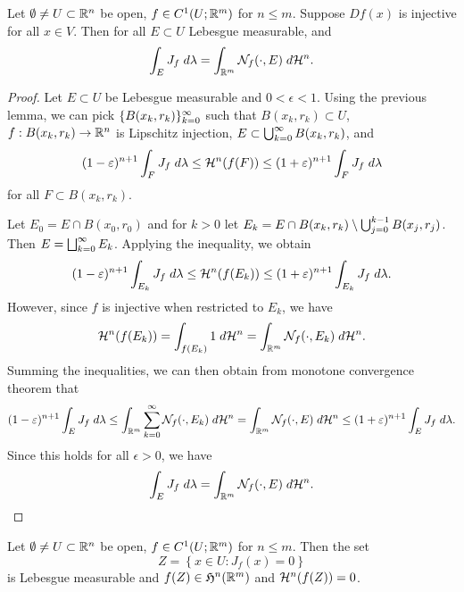 \documentclass[a4paper]{article}
\begin{document}
\begin{lemma}
Let $\emptyset \neq U \subset \mathbb{R}^n$ be open, $f \in C^1
(U ; \mathbb{R}^m)$ for $n \leq m$. Suppose $Df(x)$ is injective
for all $x \in V$. Then for all $E \subset U$ Lebesgue
measurable, and
\[
\int_E J_f \; d \lambda = \int_{\mathbb{R}^m} \mathcal{N}_f (\cdot, E) \; d \mathcal{H}^n.
\]
\end{lemma}

\begin{proof}
Let $E \subset U$ be Lebesgue measurable and $0 < \epsilon < 1$.
Using the previous lemma, we can pick $\{ B(x_k, r_k) \}_{k=0}^\infty$
such that $B(x_k, r_k) \subset U$, $f : B(x_k, r_k) \to \mathbb{R}^n$
is Lipschitz injection, $E \subset \bigcup_{k=0}^\infty B(x_k, r_k)$, and
\[
(1 - \varepsilon)^{n+1} \int_F J_f \; d \lambda
\leq \mathcal{H}^n (f(F))
\leq (1 + \varepsilon)^{n+1} \int_F J_f \; d \lambda
\]
for all $F \subset B(x_k, r_k)$.

Let $E_0 = E \cap B(x_0, r_0)$ and for $k > 0$ let
$E_k = E \cap B(x_k, r_k) \setminus \bigcup_{j=0}^{k-1} B(x_j, r_j)$.
Then $E = \bigsqcup_{k=0}^\infty E_k$. Applying the inequality, we obtain
\[
(1 - \varepsilon)^{n+1} \int_{E_k} J_f \; d \lambda
\leq \mathcal{H}^n (f(E_k))
\leq (1 + \varepsilon)^{n+1} \int_{E_k} J_f \; d \lambda.
\]
However, since $f$ is injective when restricted to $E_k$,
we have
\[
\mathcal{H}^n (f(E_k))
= \int_{f(E_k)} 1 \; d \mathcal{H}^n
= \int_{\mathbb{R}^m} \mathcal{N}_f(\cdot, E_k) \; d \mathcal{H}^n.
\]
Summing the inequalities, we can then obtain from monotone
convergence theorem that
\[
(1 - \varepsilon)^{n+1} \int_E J_f \; d \lambda
\leq \int_{\mathbb{R}^m} \sum_{k=0}^\infty \mathcal{N}_f(\cdot, E_k) \; d \mathcal{H}^n
= \int_{\mathbb{R}^m} \mathcal{N}_f(\cdot, E) \; d \mathcal{H}^n
\leq (1 + \varepsilon)^{n+1} \int_E J_f \; d \lambda.
\]
Since this holds for all $\epsilon > 0$, we have
\[
\int_E J_f \; d \lambda = \int_{\mathbb{R}^m} \mathcal{N}_f(\cdot, E) \; d \mathcal{H}^n.
\]
\end{proof}

\begin{thm}
Let $\emptyset \neq U \subset \mathbb{R}^n$ be open, $f \in C^1 (U;
\mathbb{R}^m)$ for $n \leq m$. Then the set
\[
Z = \left\{ x \in U: J_f(x) = 0 \right\}
\]
is Lebesgue measurable and $f(Z) \in \mathfrak{H}^n(\mathbb{R}^m)$ and
$\mathcal{H}^n (f(Z)) = 0$.
\end{thm}
\end{document}

